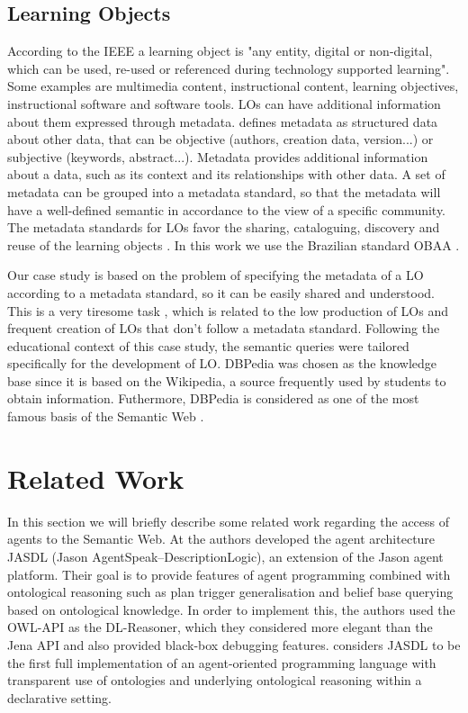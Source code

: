 \documentclass[a4paper,twoside]{article}
\begin{document}
\subsection{Learning Objects}

\noindent According to the IEEE \cite{ref40} a learning object is "any entity, digital or non-digital, which can be used, re-used or referenced during technology supported learning". Some examples are multimedia content, instructional content, learning objectives, instructional software and software tools. LOs can have additional information about them expressed through metadata.
\cite{ref42} defines metadata as structured data about other data, that can be objective (authors, creation data, version...) or subjective (keywords, abstract...). Metadata provides additional information about a data, such as its context and its relationships with other data. A set of metadata can be grouped into a metadata standard, so that the metadata will have a well-defined semantic in accordance to the view of a specific community. The metadata standards for LOs favor the sharing, cataloguing, discovery and reuse of the learning objects \cite{ref42}. In this work we use the Brazilian standard OBAA \cite{refOBAA}.

Our case study is based on the problem of specifying the metadata of a LO according to a metadata standard, so it can be easily shared and understood. This is a very tiresome task \cite{ref38}, which is related to the low production of LOs and frequent creation of LOs that don't follow a metadata standard. Following the educational context of this case study, the semantic queries were tailored specifically for the development of LO. DBPedia was chosen as the knowledge base since it is based on the Wikipedia, a source frequently used by students to obtain information. Futhermore, DBPedia is considered as one of the most famous basis of the Semantic Web \cite{refEntrevista}.

\section{Related Work}

\noindent In this section we will briefly describe some related work regarding the access of agents to the Semantic Web. At \cite{refB} the authors developed the agent architecture JASDL (Jason AgentSpeak–DescriptionLogic), an  extension of the Jason agent platform. Their goal is to provide features of agent programming combined with ontological reasoning such as plan trigger generalisation and belief base querying based on ontological knowledge. In order to implement this, the authors used the OWL-API as the DL-Reasoner, which they considered more elegant than the Jena API and also provided black-box debugging features. \cite{refB} considers JASDL to be the first full implementation of an agent-oriented programming language with transparent use of ontologies and underlying ontological reasoning within a declarative setting.
\end{document}
